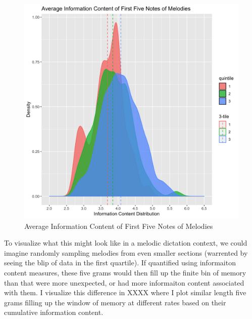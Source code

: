 \documentclass[]{book}
\begin{document}
\begin{figure}

{\centering \includegraphics[width=1\linewidth]{img/tri_distribution} 

}

\caption{Average Information Content of First Five Notes of Melodies}\label{fig:tridensity}
\end{figure}

To visualize what this might look like in a melodic dictation context, we could imagine randomly sampling melodies from even smaller sections (warrented by seeing the blip of data in the first quartile).
If quantified using informaiton content measures, these five grams would then fill up the finite bin of memory than that were more unexpected, or had more informaiton content associated with them.
I visualize this difference in XXXX where I plot similar length five grams filling up the window of memory at different rates based on their cumulative information content.
\end{document}
